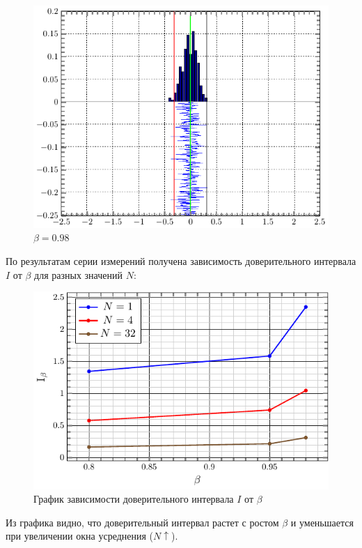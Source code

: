 \documentclass[a4paper,14pt]{extarticle}
\begin{document}
\begin{figure}[H]
\begin{minipage}{0.3\linewidth}
    \caption{$\beta =0.95$}
\end{minipage}
\begin{minipage}{0.3\linewidth}
    \centering
    \includegraphics[width=\linewidth]{fig/gist_n32_b98.pdf}
    \vspace{-1em}
    \caption{$\beta =0.98$}
\end{minipage}
\end{figure}

По результатам серии измерений получена зависимость доверительного интервала $I$ от $\beta$ для разных значений $N$:
 \begin{figure}[H]
    \centering
    \includegraphics[width=0.8\linewidth]{fig/I_from_beta}
    \caption{График зависимости доверительного интервала $I$ от $\beta$}
\end{figure}
Из графика видно, что доверительный интервал растет с ростом $\beta$ и уменьшается при увеличении окна усреднения ($N\uparrow$).
\end{document}
